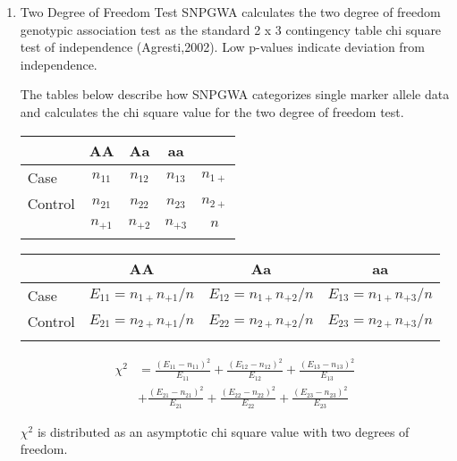 \begin{enumerate}
\item{Two Degree of Freedom Test} SNPGWA calculates the two degree of freedom
  genotypic association test as the standard 2 x 3 contingency table chi square
  test of independence (Agresti,2002).  Low p-values indicate deviation from
  independence.

The tables below describe how SNPGWA categorizes single marker allele data and
calculates the chi square value for the two degree of freedom test.

\begin{center}
  \begin{tabular}{lcccc}
    \hline
    {}     & \textbf{AA} & \textbf{Aa} & \textbf{aa} & \\
    \hline
    Case    & $n_{11}$ & $n_{12}$ & $n_{13}$ & $n_{1+}$ \\
    Control & $n_{21}$ & $n_{22}$ & $n_{23}$ & $n_{2+}$ \\
    {}    & $n_{+1}$ & $n_{+2}$ & $n_{+3}$ & $n$     \\
    \hline
    \label{tab:n_tab}
  \end{tabular}
\end{center}

\begin{center}
  \begin{tabular}{lccc}
    \hline
    {} & \textbf{AA} & \textbf{Aa} & \textbf{aa} \\
    \hline
    Case    & $E_{11} = n_{1+}n_{+1}/n$ & $E_{12} = n_{1+}n_{+2}/n$ & $E_{13} = n_{1+}n_{+3}/n$ \\
    Control & $E_{21} = n_{2+}n_{+1}/n$ & $E_{22} = n_{2+}n_{+2}/n$ & $E_{23} = n_{2+}n_{+3}/n$ \\
    \hline
    \label{tab:e_tab}
  \end{tabular}
\end{center}

\begin{align*}
  \chi^2 &= \frac{(E_{11}-n_{11})^2}{E_{11}} + \frac{(E_{12}-n_{12})^2}{E_{12}} + \frac{(E_{13}-n_{13})^2}{E_{13}} \\
         &+ \frac{(E_{21}-n_{21})^2}{E_{21}} + \frac{(E_{22}-n_{22})^2}{E_{22}} + \frac{(E_{23}-n_{23})^2}{E_{23}}
\end{align*}

\noindent{}$\chi^2$ is distributed as an asymptotic chi square value with two
degrees of freedom.


\end{enumerate}
